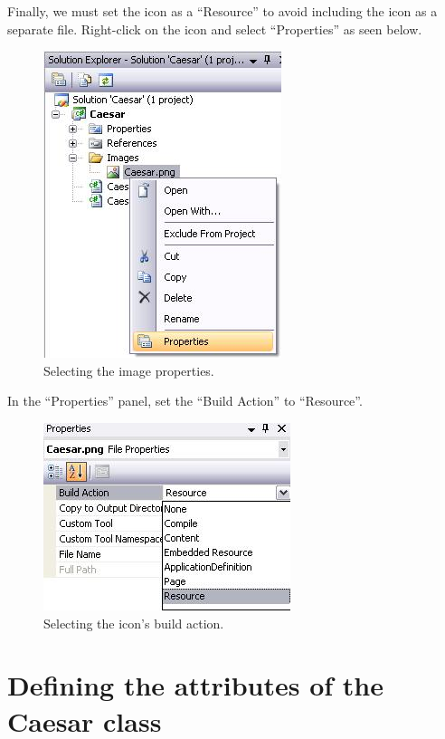 Finally, we must set the icon as a ``Resource'' to avoid including the icon as a separate file. Right-click on the icon and select ``Properties'' as seen below.

\begin{figure}[h!]
	\centering
		\includegraphics{figures/icon_properties.jpg}
	\caption{Selecting the image properties.}
	\label{fig:icon_properties}
\end{figure}

In the ``Properties'' panel, set the ``Build Action'' to ``Resource''.

\begin{figure}[h!]
	\centering
		\includegraphics{figures/icon_build_action.jpg}
	\caption{Selecting the icon's build action.}
	\label{fig:icon_build_action}
\end{figure}
\clearpage

\section{Defining the attributes of the Caesar class}
\label{sec:DefiningTheAttributesOfTheCaesarClass}

